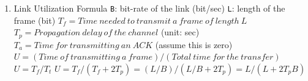 \documentclass[a4paper,10pt]{article}
\begin{document}
\begin{enumerate}
  \item Link Utilization Formula
    \newline\texttt{B}: bit-rate of the link (bit/sec)
    \newline\texttt{L}: length of the frame (bit)
    \newline $ T_f = Time\ needed\ to\ transmit\ a\ frame\ of\ length\ L $
    \newline $ T_p = Propagation\ delay\ of\ the\ channel $ (unit: sec)
    \newline $ T_a = Time\ for\ transmitting\ an\ ACK $ (assume this is zero)
    \newline $ U = (Time\ of\ transmitting\ a\ frame)/(Total\ time\ for\ the\ transfer) $
    \newline $ U = T_f/T_t $
    \newline $ U = T_f/(T_f+2T_p) = (L/B)/(L/B+2T_p) = L/(L+2T_p B) $
\end{enumerate}
  
\end{document}
